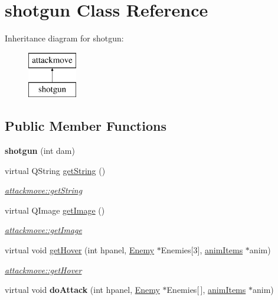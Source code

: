 \hypertarget{classshotgun}{\section{shotgun Class Reference}
\label{classshotgun}
}
Inheritance diagram for shotgun\-:\begin{figure}[H]
\begin{center}
\leavevmode
\includegraphics[height=2.000000cm]{classshotgun}
\end{center}
\end{figure}
\subsection*{Public Member Functions}
\begin{DoxyCompactItemize}
\item 
\hypertarget{classshotgun_adbc12267b0204869263cd2813fb6ccc1}{{\bfseries shotgun} (int dam)}\label{classshotgun_adbc12267b0204869263cd2813fb6ccc1}

\item 
virtual Q\-String \hyperlink{classshotgun_a856fa8335ee3c2bb8603e83aa5629e5c}{get\-String} ()
\begin{DoxyCompactList}\small\item\em \hyperlink{classattackmove_ada49eedf4b893372c576edd48fe73161}{attackmove\-::get\-String} \end{DoxyCompactList}\item 
virtual Q\-Image \hyperlink{classshotgun_a1336af80f8d3f7d19ac954f2e616a1b0}{get\-Image} ()
\begin{DoxyCompactList}\small\item\em \hyperlink{classattackmove_aca59a2343b7a6c195d300dda5c8d952d}{attackmove\-::get\-Image} \end{DoxyCompactList}\item 
virtual void \hyperlink{classshotgun_a8334202fd30d71432db7e58fca7a462e}{get\-Hover} (int hpanel, \hyperlink{class_enemy}{Enemy} $\ast$Enemies\mbox{[}3\mbox{]}, \hyperlink{classanim_items}{anim\-Items} $\ast$anim)
\begin{DoxyCompactList}\small\item\em \hyperlink{classattackmove_a0ff82349551bd72f4d57b3367bb318fa}{attackmove\-::get\-Hover} \end{DoxyCompactList}\item 
\hypertarget{classshotgun_a38d2c751cb6f3bed896d8d71c5354de5}{virtual void {\bfseries do\-Attack} (int hpanel, \hyperlink{class_enemy}{Enemy} $\ast$Enemies\mbox{[}$\,$\mbox{]}, \hyperlink{classanim_items}{anim\-Items} $\ast$anim)}\label{classshotgun_a38d2c751cb6f3bed896d8d71c5354de5}

\end{DoxyCompactItemize}
